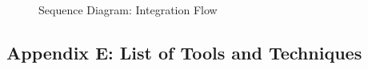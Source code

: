 \documentclass[12pt]{article} %
\begin{document}
		\begin{figure}[H] %
			\caption{Sequence Diagram: Integration Flow}
			\label{fig:speciation}
		\end{figure}
		
	\newpage
		
	\subsection{Appendix E: List of Tools and Techniques}
\end{document}
